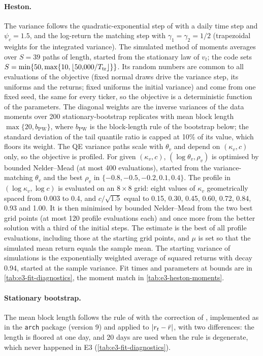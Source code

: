 \paragraph{Heston.}
The variance follows the quadratic-exponential step of \citet{andersen_2008_simple} with a daily
time step and $\psi_c=1.5$, and the log-return the matching step with $\gamma_1=\gamma_2=1/2$
(trapezoidal weights for the integrated variance). The simulated method of moments averages
over $S=39$ paths of \TRAIN{} length, started from the stationary law of $v_t$; the code sets
$S=\min\{50,\max\{10,\lfloor50{,}000/T_{\mathrm{tr}}\rfloor\}\}$. Its random numbers are common to all evaluations of the objective
(fixed normal draws drive the variance step, its uniforms and the returns; fixed uniforms the
initial variance) and come from one fixed seed, the same for every ticker, so the objective is a
deterministic function of the parameters. The diagonal weights are the inverse variances of the
data moments over 200 stationary-bootstrap replicates with mean block length
$\max\{20,b_{\mathrm{PW}}\}$, where $b_{\mathrm{PW}}$ is the block-length rule of the bootstrap
below; the standard deviation of the tail quantile ratio is capped at 10\% of its value, which
floors its weight. The QE variance paths scale with $\theta_v$ and depend on $(\kappa_v,c)$
only, so the objective is profiled. For given $(\kappa_v,c)$, $(\log\theta_v,\rho_v)$ is
optimised by bounded Nelder--Mead (at most 400 evaluations), started from the variance-matching
$\theta_v$ and the best $\rho_v$ in $\{-0.8,-0.5,-0.2,0.1,0.4\}$. The profile in
$(\log\kappa_v,\log c)$ is evaluated on an $8\times8$ grid: eight values of $\kappa_v$
geometrically spaced from 0.003 to 0.4, and $c/\sqrt{1.5}$ equal to 0.15, 0.30, 0.45, 0.60,
0.72, 0.84, 0.93 and 1.00. It is then
minimised by bounded Nelder--Mead from the two best grid points (at most 120 profile evaluations
each) and once more from the better solution with a third of the initial steps. The estimate is
the best of all profile evaluations, including those at the starting grid points, and $\mu$ is set so that the
simulated mean return equals the sample mean. The starting variance of \TEST{} simulations is
the exponentially weighted average of squared \TRAIN{} returns with decay 0.94, started at the
sample variance. Fit times and parameters at bounds are in \cref{tab:e3-fit-diagnostics}, the
moment match in \cref{tab:e3-heston-moments}.

\paragraph{Stationary bootstrap.}
The mean block length follows the rule of \citet{politis2004automatic} with the correction of
\citet{patton2009correction}, implemented as in the \texttt{arch} package (version 9) and applied
to $\lvert r_t-\bar r\rvert$, with two differences: the length is floored at one day, and 20 days are
used when the rule is degenerate, which never happened in E3 (\cref{tab:e3-fit-diagnostics}).

